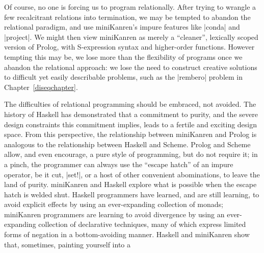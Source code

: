 Of course, no one is forcing us to program relationally.  After trying
to wrangle a few recalcitrant relations into termination, we may be
tempted to abandon the relational paradigm, and use miniKanren's
impure features like \scheme|conda| and \scheme|project|.  We might
then view miniKanren as merely a ``cleaner'', lexically scoped version
of Prolog, with S-expression syntax and higher-order functions.
However tempting this may be, we lose more than the flexibility of
programs once we abandon the relational approach: we lose the need to
construct creative solutions to difficult yet easily describable
problems, such as the \scheme|rembero| problem in
Chapter~\ref{diseqchapter}.  

The difficulties of relational programming should be embraced, not
avoided.  The history of Haskell has demonstrated that a commitment to
purity, and the severe design constraints this commitment implies,
leads to a fertile and exciting design space.  From this perspective,
the relationship between miniKanren and Prolog is analogous to the
relationship between Haskell and Scheme.  Prolog and Scheme allow, and
even encourage, a pure style of programming, but do not require it; in
a pinch, the programmer can always use the ``escape hatch'' of an
impure operator, be it cut, \scheme|set!|, or a host of other
convenient abominations, to leave the land of purity.  miniKanren and
Haskell explore what is possible when the escape hatch is welded shut.
Haskell programmers have learned, and are still learning, to avoid
explicit effects by using an ever-expanding collection of monads;
miniKanren programmers are learning to avoid divergence by using an
ever-expanding collection of declarative techniques, many of which
express limited forms of negation in a bottom-avoiding manner.
Haskell and miniKanren show that, sometimes, painting yourself into a
